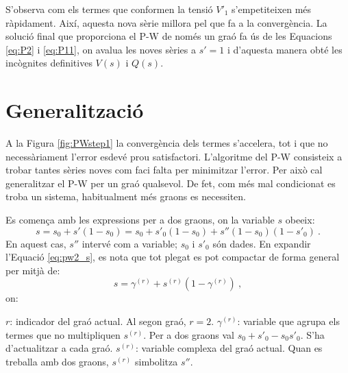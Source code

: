 S'observa com els termes que conformen la tensió $V'_{1}$ s'empetiteixen més ràpidament. Així, aquesta nova sèrie millora pel que fa a la convergència. La solució final que proporciona el P-W de només un graó fa ús de les Equacions \ref{eq:P2} i \ref{eq:P11}, on avalua les noves sèries a $s'=1$ i d'aquesta manera obté les incògnites definitives $V(s)$ i $Q(s)$. 

\section{Generalització}
A la Figura \ref{fig:PWstep1} la convergència dels termes s'accelera, tot i que no necessàriament l'error esdevé prou satisfactori. L'algoritme del P-W consisteix a trobar tantes sèries noves com faci falta per minimitzar l'error. Per això cal generalitzar el P-W per un graó qualsevol. De fet, com més mal condicionat es troba un sistema, habitualment més graons es necessiten.

Es comença amb les expressions per a dos graons, on la variable $s$ obeeix:
\begin{equation}
    s=s_0+s'(1-s_0)=s_0+s'_0(1-s_0)+s''(1-s_0)(1-s'_0)\ .
    \label{eq:pw2_s}
\end{equation}
En aquest cas, $s''$ intervé com a variable; $s_0$ i $s'_0$ són dades. En expandir l'Equació \ref{eq:pw2_s}, es nota que tot plegat es pot compactar de forma general per mitjà de:
\begin{equation}
    s = \gamma^{(r)} + s^{(r)}(1-\gamma^{(r)})\ ,
    \label{eq:pw2_gamm}
\end{equation}
on:

$r$: indicador del graó actual. Al segon graó, $r=2$.
\vs
$\gamma^{(r)}$: variable que agrupa els termes que no multipliquen $s^{(r)}$. Per a dos graons val $s_0+s'_0-s_0s'_0$. S'ha d'actualitzar a cada graó.
\vs
$s^{(r)}$: variable complexa del graó actual. Quan es treballa amb dos graons, 
$s^{(r)}$ simbolitza $s''$.

